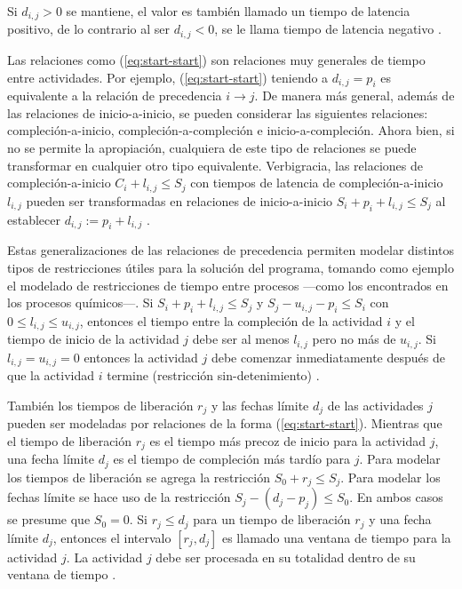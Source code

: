 \documentclass[spanish,draft,12pt,headsepline,footsepline,paper=letter]{scrreprt}
\begin{document}
Si $d_{i,j} > 0$ se mantiene, el valor es también llamado un tiempo de latencia positivo, de lo contrario al ser $d_{i,j} < 0$, se le llama tiempo de latencia negativo \citep[p.~4]{Robert2010}. 

Las relaciones como (\ref{eq:start-start}) son relaciones muy generales de tiempo entre actividades. Por ejemplo, (\ref{eq:start-start}) teniendo a $d_{i,j}=p_i$ es equivalente a la relación de precedencia $i \to j$. De manera más general, además de las relaciones de inicio-a-inicio, se pueden considerar las siguientes relaciones: compleción-a-inicio, compleción-a-compleción e inicio-a-compleción. Ahora bien, si no se permite la apropiación, cualquiera de este tipo de relaciones se puede transformar en cualquier otro tipo equivalente. Verbigracia, las relaciones de compleción-a-inicio $C_i+l_{i,j} \leq S_j$ con tiempos de latencia de compleción-a-inicio $l_{i,j}$ pueden ser transformadas en relaciones de inicio-a-inicio $S_i+p_i+l_{i,j} \leq S_j$ al establecer $d_{i,j}:=p_i+l_{i,j}$ \citep[p.~4]{Robert2010}.

Estas generalizaciones de las relaciones de precedencia permiten modelar distintos tipos de restricciones útiles para la solución del programa, tomando como ejemplo el modelado de restricciones de tiempo entre procesos —como los encontrados en los procesos químicos—. Si $S_i+p_i+l_{i,j} \leq S_j$ y $S_j-u_{i,j}-p_i \leq S_i$ con $0 \leq l_{i,j} \leq u_{i,j}$, entonces el tiempo entre la compleción de la actividad $i$ y el tiempo de inicio de la actividad $j$ debe ser al menos $l_{i,j}$ pero no más de $u_{i,j}$. Si $l_{i,j}=u_{i,j}=0$ entonces la actividad $j$ debe comenzar inmediatamente después de que la actividad $i$ termine (restricción sin\nobreakdash-detenimiento) \citep[p.~4]{Robert2010}.

También los tiempos de liberación $r_j$ y las fechas límite $d_j$ de las actividades $j$ pueden ser modeladas por relaciones de la forma (\ref{eq:start-start}). Mientras que el tiempo de liberación $r_j$ es el tiempo más precoz de inicio para la actividad $j$, una fecha límite $d_j$ es el tiempo de compleción más tardío para $j$. Para modelar los tiempos de liberación se agrega la restricción $S_0+r_j \leq S_j$. Para modelar los fechas límite se hace uso de la restricción $S_j-(d_j-p_j) \leq S_0$. En ambos casos se presume que $S_0=0$. Si $r_j \leq d_j$ para un tiempo de liberación $r_j$ y una fecha límite $d_j$, entonces el intervalo $[r_j,d_j]$ es llamado una ventana de tiempo para la actividad $j$. La actividad $j$ debe ser procesada en su totalidad dentro de su ventana de tiempo \citep[p.~4,~5]{Robert2010}.
\end{document}
